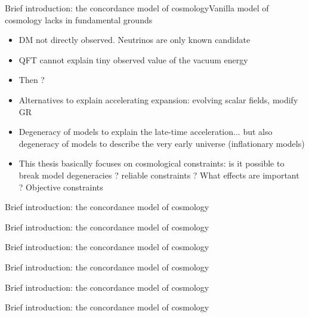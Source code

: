 \documentclass{beamer}
\begin{document}
\begin{frame}{Brief introduction: the concordance model of cosmology}{Vanilla model of cosmology lacks in fundamental grounds}
\begin{itemize}
\item DM not directly observed. Neutrinos are only known candidate
\item QFT cannot explain tiny observed value of the vacuum energy
\item Then ?
\item Alternatives to explain accelerating expansion: evolving scalar fields, modify GR 
\item Degeneracy of models to explain the late-time acceleration... but also degeneracy of models to describe the very early universe (inflationary models)
\item This thesis basically focuses on cosmological constraints: is it possible to break model degeneracies ? reliable constraints ? What effects are important ? Objective constraints  
\end{itemize}
\end{frame}

\begin{frame}{Brief introduction: the concordance model of cosmology}

\end{frame}

\begin{frame}{Brief introduction: the concordance model of cosmology}

\end{frame}

\begin{frame}{Brief introduction: the concordance model of cosmology}

\end{frame}

\begin{frame}{Brief introduction: the concordance model of cosmology}

\end{frame}

\begin{frame}{Brief introduction: the concordance model of cosmology}

\end{frame}

\begin{frame}{Brief introduction: the concordance model of cosmology}

\end{frame}
\end{document}
